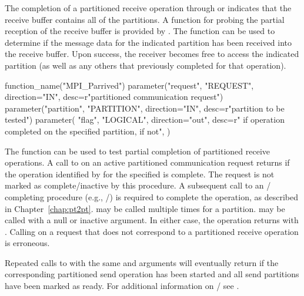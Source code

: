 The completion of a partitioned receive operation through  or
 indicates that the receive buffer contains all of the
partitions. A function for probing the partial reception of the receive buffer is provided by 
.
The  function can be used to determine if
the message data for the indicated partition has been received into the receive buffer. Upon success, the
receiver becomes free to access the indicated partition (as well as any others
that previously completed for that operation).  

\begin{mpi-binding}
    function_name("MPI_Parrived")
    parameter("request", "REQUEST", direction="IN", desc=r"partitioned communication request")
    parameter("partition", "PARTITION", direction="IN", desc=r"partition to be tested")
    parameter(
        "flag",
        "LOGICAL",
        direction="out",
        desc=r" if operation completed on the specified partition,  if not",
    )
\end{mpi-binding}

The function  can be used to
test partial completion of partitioned receive operations.
A call to  on an active partitioned communication request
returns  if the
operation identified by  for the specified  is complete.  
The request is not marked as complete/inactive by this procedure.
A subsequent call to an \MPI/ completing procedure (e.g., /) is required to
complete the operation, as described in Chapter~\ref{chap:pt2pt}.
 may be called multiple times for a partition.
 may be called with a null or inactive 
argument. In either case, the operation returns with .
Calling  on a request that does not correspond to a partitioned
receive operation is erroneous.

Repeated calls to  with the same  and  arguments will 
eventually return  if the corresponding partitioned send operation has
been started and all send partitions have been marked as ready. For additional information on \MPI/ 
 see
 .

